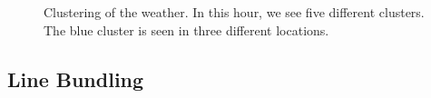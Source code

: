 \documentclass[journal]{vgtc}                %
\begin{document}
\begin{figure}[htp]
  \centering
  \quad
  \quad
\caption{Clustering of the weather. In this hour, we see five different clusters. The blue cluster is seen in three different locations.}
\label{fig:clusters}
\end{figure}

\subsection{Line Bundling}
\label{sec:line}
\end{document}
